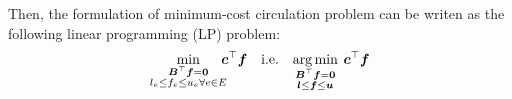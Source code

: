 \documentclass{article} %
\theoremstyle{bfnote}
\begin{document}
Then, the formulation of minimum-cost circulation problem can be writen as the following linear programming (LP) problem:
\begin{equation}
	\underset{\substack{\bm{B}^{\top} \bm{f}=\bm{0} \\ l_e \leq f_e \leq u_e \forall e \in E}}{\min } \hspace{-4pt} \bm{c}^{\top} \bm{f} \quad  \text{i.e.}	\quad 
	\underset{\substack{\bm{B}^{\top} \bm{f}=\bm{0} \\ \bm{l} \leq \bm{f} \leq \bm{u} }}{\arg \min } \hspace{4pt} \bm{c}^{\top} \bm{f}	
	\label{eq:5}
\end{equation}

\end{document}
